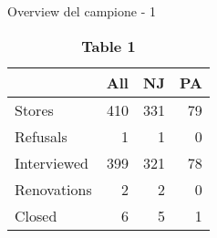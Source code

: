\documentclass[
  ignorenonframetext,
]{beamer}
\begin{document}
\begin{frame}{Overview del campione - 1}
\protect\hypertarget{overview-del-campione---1}{}

\captionsetup[table]{labelformat=empty}
\begin{table}

\caption{\label{tab:unnamed-chunk-1}\textbf{Table 1}}
\centering
\begin{tabular}[t]{lrrr}
\toprule
  & All & NJ & PA\\
\midrule
Stores & 410 & 331 & 79\\
Refusals & 1 & 1 & 0\\
Interviewed & 399 & 321 & 78\\
Renovations & 2 & 2 & 0\\
Closed & 6 & 5 & 1\\
\bottomrule
\end{tabular}
\end{table}

\end{frame}
\end{document}
